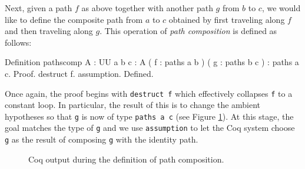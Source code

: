 Next, given a path $f$ as above together with another path $g$ from
$b$ to $c$, we would like to define the composite path from $a$ to $c$
obtained by first traveling along $f$ and then traveling along $g$.
This operation of \emph{path composition} is defined as follows:
\begin{center}
  \begin{coqcode}
Definition pathscomp { A : UU } { a b c : A } ( f : paths a b ) ( g : paths b c ) : paths a c.
Proof.
  destruct f. assumption.
Defined.
  \end{coqcode}
\end{center}
Once again, the proof begins with \verb|destruct f| which
effectively collapses \verb|f| to a constant loop.  In
particular, the result of this is to change the ambient hypotheses so
that \verb|g| is now of type \verb|paths a c| (see Figure
\ref{figure:pathscomp}).  At this stage, the goal matches the type of
\verb|g| and we use \verb|assumption| to let the Coq system
choose \verb|g| as the result of composing \verb|g| with the
identity path.
\begin{figure}[H]
  \caption{Coq output during the definition of path composition.}
  \label{figure:pathscomp}
\end{figure}
